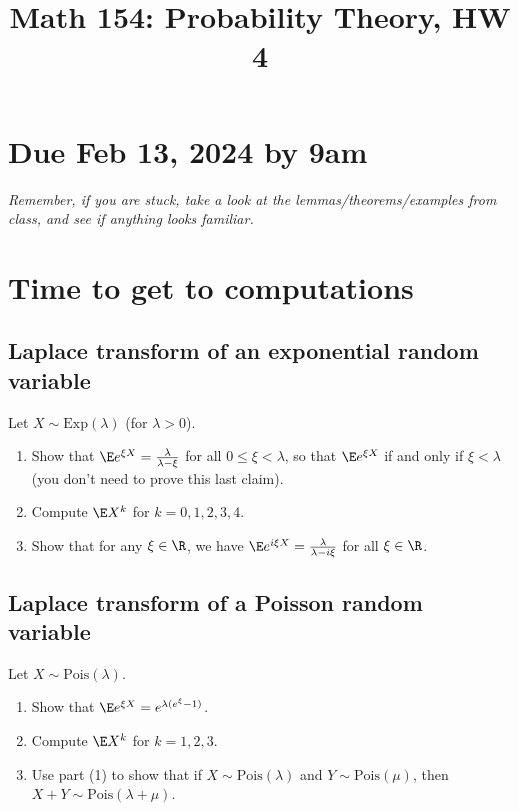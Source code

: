\documentclass[12pt,reqno]{amsart}
\title{\Large Math 154: Probability Theory, HW 4\vspace{-0.1cm}}
\theoremstyle{definition}
\theoremstyle{remark}
\numberwithin{equation}{section}
\newenvironment{nouppercase}{%
  \let\uppercase\relax%
  \renewcommand{\uppercasenonmath}[1]{}}{}
\begin{document}
\begin{nouppercase}
\maketitle
\end{nouppercase}
\section*{Due Feb 13, 2024 by 9am}
\emph{Remember, if you are stuck, take a look at the lemmas/theorems/examples from class, and see if anything looks familiar.}
\section{Time to get to computations}
\subsection{Laplace transform of an exponential random variable}
Let $X\sim\mathrm{Exp}(\lambda)$ (for $\lambda>0$). 
\begin{enumerate}
\item Show that $\E e^{\xi X}=\frac{\lambda}{\lambda-\xi}$ for all $0\leq\xi<\lambda$, so that $\E e^{\xi X}$ if and only if $\xi<\lambda$ (you don't need to prove this last claim).
\item Compute $\E X^{k}$ for $k=0,1,2,3,4$.
\item Show that for any $\xi\in\R$, we have $\E e^{i\xi X}=\frac{\lambda}{\lambda-i\xi}$ for all $\xi\in\R$.
\end{enumerate}
\subsection{Laplace transform of a Poisson random variable}
Let $X\sim \mathrm{Pois}(\lambda)$.
\begin{enumerate}
\item Show that $\E e^{\xi X}=e^{\lambda(e^{\xi}-1)}$.
\item Compute $\E X^{k}$ for $k=1,2,3$.
\item Use part (1) to show that if $X\sim\mathrm{Pois}(\lambda)$ and $Y\sim\mathrm{Pois}(\mu)$, then $X+Y\sim\mathrm{Pois}(\lambda+\mu)$.
\end{enumerate}
\end{document}
